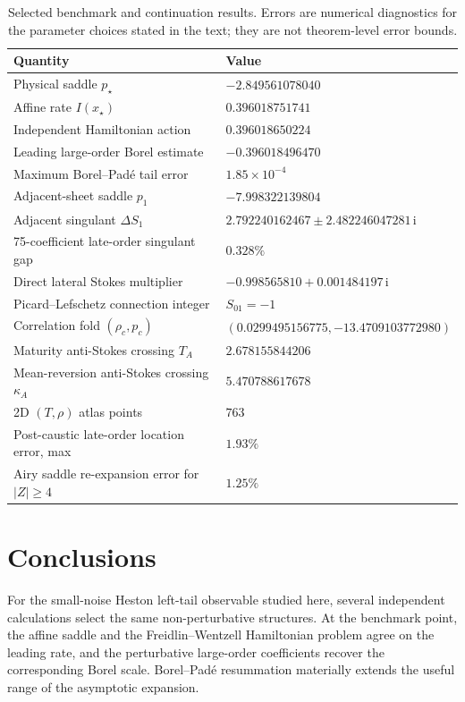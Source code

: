 \documentclass[11pt]{article}
\newcommand{\ii}{\mathrm i}
\begin{document}
\begin{table}[H]
\centering
\small
\begin{tabular}{ll}
\toprule
Quantity & Value \\
\midrule
Physical saddle $p_\star$ & $-2.849561078040$ \\
Affine rate $I(x_\star)$ & $0.396018751741$ \\
Independent Hamiltonian action & $0.396018650224$ \\
Leading large-order Borel estimate & $-0.396018496470$ \\
Maximum Borel--Pad\'e tail error & $1.85\times10^{-4}$ \\
Adjacent-sheet saddle $p_1$ & $-7.998322139804$ \\
Adjacent singulant $\Delta S_1$ & $2.792240162467\pm2.482246047281\,\ii$ \\
75-coefficient late-order singulant gap & $0.328\%$ \\
Direct lateral Stokes multiplier & $-0.998565810+0.001484197\,\ii$ \\
Picard--Lefschetz connection integer & $S_{01}=-1$ \\
Correlation fold $(\rho_c,p_c)$ & $(0.0299495156775,-13.4709103772980)$ \\
Maturity anti-Stokes crossing $T_A$ & $2.678155844206$ \\
Mean-reversion anti-Stokes crossing $\kappa_A$ & $5.470788617678$ \\
2D $(T,\rho)$ atlas points & $763$ \\
Post-caustic late-order location error, max & $1.93\%$ \\
Airy saddle re-expansion error for $|Z|\ge4$ & $1.25\%$ \\
\bottomrule
\end{tabular}
\caption{Selected benchmark and continuation results.  Errors are numerical diagnostics for the parameter choices stated in the text; they are not theorem-level error bounds.}
\label{tab:results}
\end{table}

\section{Conclusions}
For the small-noise Heston left-tail observable studied here, several independent calculations select the same non-perturbative structures.  At the benchmark point, the affine saddle and the Freidlin--Wentzell Hamiltonian problem agree on the leading rate, and the perturbative large-order coefficients recover the corresponding Borel scale.  Borel--Pad\'e resummation materially extends the useful range of the asymptotic expansion.
\end{document}
